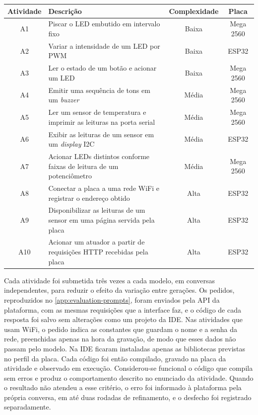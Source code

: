 \begin{quadro}[!htb]
  \centering
  \caption{Atividades práticas utilizadas na avaliação}
  \label{qua:activities}
  \begin{tabularx}{\textwidth}{|c|X|c|c|}
    \hline
    \textbf{Atividade} & \textbf{Descrição} & \textbf{Complexidade} & \textbf{Placa} \\
    \hline
    A1 & Piscar o LED embutido em intervalo fixo & Baixa & Mega 2560 \\
    \hline
    A2 & Variar a intensidade de um LED por PWM & Baixa & ESP32 \\
    \hline
    A3 & Ler o estado de um botão e acionar um LED & Baixa & Mega 2560 \\
    \hline
    A4 & Emitir uma sequência de tons em um \textit{buzzer} & Média & Mega 2560 \\
    \hline
    A5 & Ler um sensor de temperatura e imprimir as leituras na porta serial & Média & Mega 2560 \\
    \hline
    A6 & Exibir as leituras de um sensor em um \textit{display} I2C & Média & ESP32 \\
    \hline
    A7 & Acionar LEDs distintos conforme faixas de leitura de um potenciômetro & Média & Mega 2560 \\
    \hline
    A8 & Conectar a placa a uma rede WiFi e registrar o endereço obtido & Alta & ESP32 \\
    \hline
    A9 & Disponibilizar as leituras de um sensor em uma página servida pela placa & Alta & ESP32 \\
    \hline
    A10 & Acionar um atuador a partir de requisições HTTP recebidas pela placa & Alta & ESP32 \\
    \hline
  \end{tabularx}
\end{quadro}

Cada atividade foi submetida três vezes a cada modelo, em conversas independentes, para reduzir o efeito da variação entre gerações. Os pedidos, reproduzidos no \autoref{app:evaluation-prompts}, foram enviados pela API da plataforma, com as mesmas requisições que a interface faz, e o código de cada resposta foi salvo sem alterações como um projeto da IDE. Nas atividades que usam WiFi, o pedido indica as constantes que guardam o nome e a senha da rede, preenchidas apenas na hora da gravação, de modo que esses dados não passam pelo modelo. Na IDE ficaram instaladas apenas as bibliotecas previstas no perfil da placa. Cada código foi então compilado, gravado na placa da atividade e observado em execução. Considerou-se funcional o código que compila sem erros e produz o comportamento descrito no enunciado da atividade. Quando o resultado não atendeu a esse critério, o erro foi informado à plataforma pela própria conversa, em até duas rodadas de refinamento, e o desfecho foi registrado separadamente.

